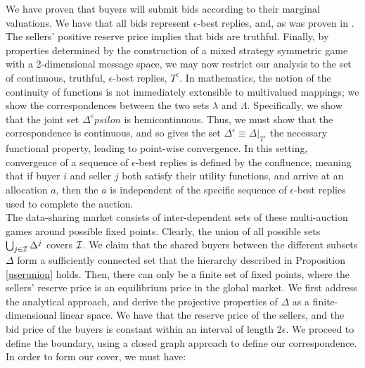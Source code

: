 We have proven that buyers will submit bids according to their marginal valuations. We have that all bids represent $\epsilon$-best replies, and, as was proven in
\cite{lazar}. The sellers' positive reserve price implies that bids are truthful. Finally, by properties determined by the construction of a mixed strategy symmetric game with a 2-dimensional message space, we may now restrict our analysis to the set of continuous, truthful, $\epsilon$-best replies, $T^\epsilon$.
In mathematics, the notion of the continuity of functions is not immediately extensible to multivalued mappings; we show the correspondences between the two sets $\lambda$ and $\Lambda$. Specifically, we show that the joint set $\Delta^epsilon$ is hemicontinuous. Thus, we must show that the correspondence is continuous, and so gives the set $\Delta^{\epsilon} \equiv \Delta\vert_{T^\epsilon}$ the necessary functional property, leading to point-wise convergence. In this setting, convergence of a sequence of $\epsilon$-best replies is defined by the confluence, meaning that if buyer $i$ and seller $j$ both satisfy their utility functions, and arrive at an allocation $a$, then the $a$ is independent of the specific sequence of $\epsilon$-best replies used to complete the auction.\\
The data-sharing market consists of inter-dependent sets of these multi-auction games around possible fixed points.  Clearly, the union of all possible sets $\bigcup_{j\in\mathcal{I}} \Delta^j$ covers $\mathcal{I}$. We claim that the shared buyers between the different subsets $\Delta$ form a sufficiently connected set that the hierarchy described in Proposition \ref{userunion} holds. Then, there can only be a finite set of fixed points, where the sellers' reserve price is an equilibrium price in the global market. We first address the analytical approach, and derive the projective properties of $\Delta$ as a finite-dimensional linear space. We have that the reserve price of the sellers, and the bid price of the buyers is constant within an interval of length 2$\epsilon$. We proceed to define the boundary, using a closed graph approach to define our correspondence.\\
In order to form our cover, we must have:
